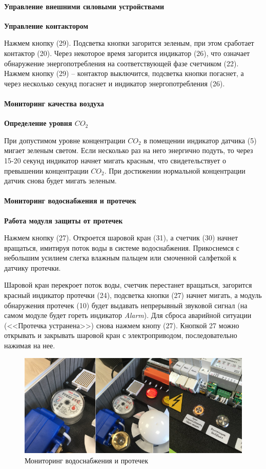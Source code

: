 \documentclass[a4paper,14pt]{extarticle}
\begin{document}
\paragraph* {Управление внешними силовыми устройствами}
	\script \textbf{Управление контактором}

	Нажмем кнопку (29). Подсветка кнопки загорится зеленым, при этом сработает
	контактор (20). Через некоторое время загорится индикатор (26), что означает обнаружение
	энергопотребления на соответствующей фазе счетчиком (22). Нажмем кнопку (29) --
	контактор выключится, подсветка кнопки погаснет, а через несколько секунд погаснет и
	индикатор энергопотребления (26).
\paragraph*{Мониторинг качества воздуха}
	\script \textbf{Определение уровня $CO_2$} 
	
	При допустимом уровне концентрации $CO_2$ в помещении индикатор датчика (5)
	мигает зеленым светом. Если несколько раз на него энергично подуть, то через 15-20 секунд
	индикатор начнет мигать красным, что свидетельствует о превышении концентрации $CO_2$.
	При достижении нормальной концентрации датчик снова будет мигать зеленым.
\paragraph*{Мониторинг водоснабжения и протечек}
	\script \textbf{Работа модуля защиты от протечек}
	
	Нажмем кнопку (27). Откроется шаровой кран (31), а счетчик (30) начнет вращаться,
	имитируя поток воды в системе водоснабжения. Прикоснемся с небольшим усилием
	слегка влажным пальцем или смоченной салфеткой к датчику протечки.
	
	Шаровой кран перекроет поток воды, счетчик перестанет
	вращаться, загорится красный индикатор протечки (24), подсветка кнопки (27) начнет
	мигать, а модуль обнаружения протечек (10) будет выдавать непрерывный звуковой сигнал
	(на самом модуле будет гореть индикатор \textit{Alarm}). Для сброса аварийной ситуации
	(<<Протечка устранена>>) снова нажмем кнопу (27).
	Кнопкой 27 можно открывать и закрывать шаровой кран с электроприводом,
	последовательно нажимая на нее.
	
	\begin{figure}[htbp]
		\centering
		\includegraphics[width=0.6\linewidth]{images/waterproof}
		\caption{Мониторинг водоснабжения и протечек}
		\label{fig:waterproof}
	\end{figure}
	
\end{document}
